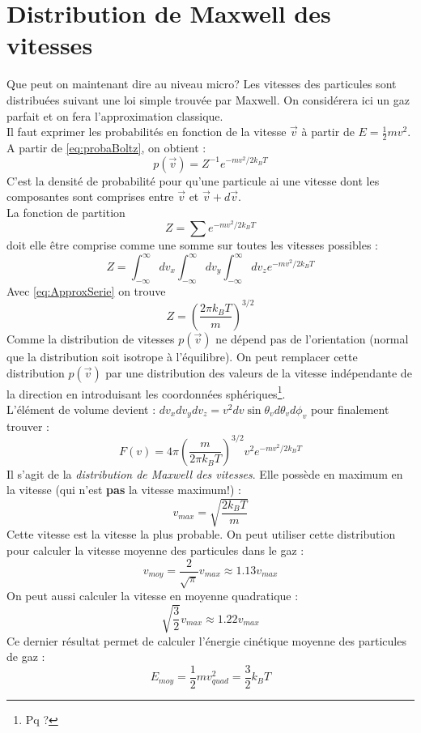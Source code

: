 \documentclass	[11pt, a4paper, openany]{book}
\begin{document}
\section{Distribution de Maxwell des vitesses}
Que peut on maintenant dire au niveau micro? Les vitesses des particules sont distribuées suivant
une loi simple trouvée par Maxwell. On considérera ici un gaz parfait et on fera l'approximation
classique.\\
Il faut exprimer les probabilités en fonction de la vitesse $\vec{v}$ à partir de $E = \frac{1}{2}
mv^2$. A partir de \autoref{eq:probaBoltz}, on obtient :
\begin{equation}
p(\vec{v}) = Z^{-1}e^{-mv^2/2k_BT}
\end{equation}
C'est la densité de probabilité pour qu'une particule ai une vitesse dont les composantes sont 
comprises entre $\vec{v}$ et $\vec{v} +d\vec{v}$.\\
La fonction de partition
\begin{equation}
Z = \sum e^{-mv^2/2k_BT}
\end{equation}
doit elle être comprise comme une somme sur toutes les vitesses possibles :
\begin{equation}
Z = \int_{-\infty}^\infty dv_x \int_{-\infty}^\infty dv_y \int_{-\infty}^\infty dv_z 
e^{-mv^2/2k_BT}
\end{equation}
Avec \autoref{eq:ApproxSerie} on trouve
\begin{equation}
Z = \left(\dfrac{2\pi k_BT}{m}\right)^{3/2}
\end{equation}
Comme la distribution de vitesses $p(\vec{v})$ ne dépend pas de l'orientation (normal que la 
distribution soit isotrope à l'équilibre). On peut remplacer cette distribution $p(\vec{v})$ 
par une distribution des valeurs de la vitesse indépendante de la direction en introduisant
les coordonnées sphériques\footnote{Pq ?}.\\
L'élément de volume devient : $dv_xdv_ydv_z = v^2dv\sin\theta_vd\theta_vd\phi_v$ pour finalement
trouver :
\begin{equation}
F(v) = 4\pi\left(\dfrac{m}{2\pi k_BT}\right)^{3/2} v^2 e^{-mv^2/2k_BT}
\end{equation}
Il s'agit de la \textit{distribution de Maxwell des vitesses}. Elle possède en maximum en la 
vitesse (qui n'est \textbf{pas} la vitesse maximum!) : 
\begin{equation}
v_{max} = \sqrt{\dfrac{2k_BT}{m}}
\end{equation}
Cette vitesse est la vitesse la plus probable. On peut utiliser cette distribution pour calculer 
la vitesse moyenne des particules dans le gaz :
\begin{equation}
v_{moy} = \frac{2}{\sqrt{\pi}}v_{max} \approx 1.13 v_{max}
\end{equation}
On peut aussi calculer la vitesse en moyenne quadratique :
\begin{equation}
\sqrt{\frac{3}{2}}v_{max} \approx 1.22 v_{max}
\end{equation}
Ce dernier résultat permet de calculer l'énergie cinétique moyenne des particules de gaz :
\begin{equation}
E_{moy} = \frac{1}{2}mv^2_{quad} = \frac{3}{2}k_BT
\end{equation}
\end{document}
